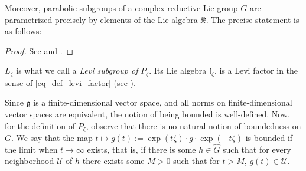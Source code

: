 
Moreover, parabolic subgroups of a complex reductive Lie group \(G\) are parametrized precisely by elements of the Lie algebra \(\ii\mathfrak{k}\). The precise statement is as follows:

\begin{proof}
    See \parencite[Lemma 2.5]{garcia2009hitchin} and \parencite[Lemma 2.12]{trautwein2015surveygitpictureyangmills}.
\end{proof}

\(L_\zeta\) is what we call a \textit{Levi subgroup of} \(P_\zeta\). Its Lie algebra \(\mathfrak{l}_\zeta\), is a Levi factor in the sense of \eqref{eq_def_levi_factor} (see \parencite[Lemma 2.14]{trautwein2015surveygitpictureyangmills}). 

\begin{obs}
    Since \(\mathfrak{g}\) is a finite-dimensional vector space, and all norms on finite-dimensional vector spaces are equivalent, the notion of being bounded is well-defined. Now, for the definition of \(P_\zeta\), observe that there is no natural notion of boundedness on \(G\). We say that the map \(t \mapsto g(t):=\exp(t\zeta)\cdot g \cdot \exp(-t\zeta)\) is bounded if the limit when \(t \to \infty\) exists, that is, if there is some \(h\in \hat{G}\) such that for every neighborhood \(\mathcal{U}\) of \(h\) there exists some \(M>0\) such that for \(t>M\), \(g(t)\in \mathcal{U}\).
\end{obs}

